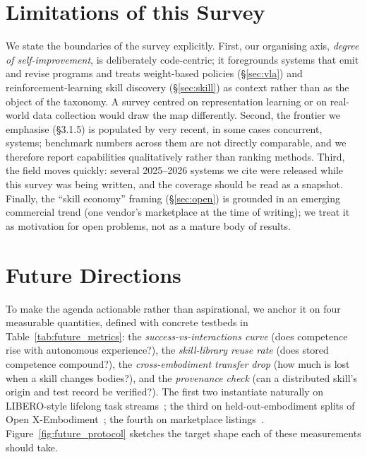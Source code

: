 \documentclass[acmsmall,review,anonymous]{acmart}
\begin{document}
\section{Limitations of this Survey}
\label{sec:limitations}

We state the boundaries of the survey explicitly. First, our organising axis, \emph{degree
of self-improvement}, is deliberately code-centric; it foregrounds systems that emit and
revise programs and treats weight-based policies (\S\ref{sec:vla}) and reinforcement-learning
skill discovery (\S\ref{sec:skill}) as context rather than as the object of the taxonomy.
A survey centred on representation learning or on real-world data collection would draw the
map differently. Second, the frontier we emphasise (\S3.1.5) is populated by very recent,
in some cases concurrent, systems; benchmark numbers across them are not directly
comparable, and we therefore report capabilities qualitatively rather than ranking methods.
Third, the field moves quickly: several 2025--2026 systems we cite were released while this
survey was being written, and the coverage should be read as a snapshot. Finally, the
``skill economy'' framing (\S\ref{sec:open}) is grounded in an emerging commercial trend
(one vendor's marketplace at the time of writing); we treat it as motivation for open
problems, not as a mature body of results.
\section{Future Directions}
\label{sec:future}

To make the agenda actionable rather than aspirational, we anchor it on four measurable
quantities, defined with concrete testbeds in Table~\ref{tab:future_metrics}: the
\emph{success-vs-interactions curve} (does competence rise with autonomous experience?), the
\emph{skill-library reuse rate} (does stored competence compound?), the \emph{cross-embodiment
transfer drop} (how much is lost when a skill changes bodies?), and the \emph{provenance check}
(can a distributed skill's origin and test record be verified?). The first two instantiate
naturally on LIBERO-style lifelong task streams~\citep{libero}; the third on held-out-embodiment
splits of Open X-Embodiment~\citep{openx}; the fourth on marketplace
listings~\citep{unistore2026}. Figure~\ref{fig:future_protocol} sketches the target shape each of
these measurements should take.
\end{document}
